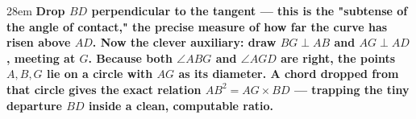 \documentclass[border=4pt]{standalone}
\begin{document}
\begin{varwidth}{28em}
\large\bfseries
Drop \textcolor{subred}{$BD$ perpendicular to the tangent} — this is the "subtense of the      angle of contact," the precise measure of how far the \textcolor{arcgreen}{curve} has risen      above \textcolor{tanblue}{$AD$}. Now the clever auxiliary: draw $BG\perp AB$ and $AG\perp AD$,      meeting at $G$. Because both $\angle ABG$ and $\angle AGD$ are right, the points      $A,B,G$ lie on \textcolor{auxpurple}{a circle with $AG$ as its diameter}. A chord dropped      from that circle gives the exact relation $AB^{2}=AG\times BD$ — trapping the tiny      \textcolor{subred}{departure $BD$} inside a clean, computable ratio.
\end{varwidth}
\end{document}
